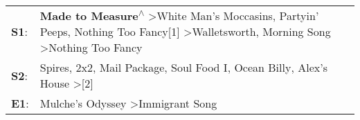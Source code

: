 \begin{supertabular}{p{0.03\textwidth}p{0.92\textwidth}}
 \textbf{S1}:  &  \textbf{Made to Measure\textsuperscript{$\wedge$}} \textgreater \enspace White Man's Moccasins\textsuperscript{}, \enspace Partyin' Peeps\textsuperscript{}, \enspace Nothing Too Fancy[1]\textsuperscript{} \textgreater \enspace Walletsworth\textsuperscript{}, \enspace Morning Song\textsuperscript{} \textgreater \enspace Nothing Too Fancy\textsuperscript{}  \enspace  \\
 \textbf{S2}:  &                                                                                            Spires\textsuperscript{}, \enspace 2x2\textsuperscript{}, \enspace Mail Package\textsuperscript{}, \enspace Soul Food I\textsuperscript{}, \enspace Ocean Billy\textsuperscript{}, \enspace Alex's House\textsuperscript{} \textgreater {}[2]\textsuperscript{}  \enspace  \\
 \textbf{E1}:  &                                                                                                                                                                                                                                                                             Mulche's Odyssey\textsuperscript{} \textgreater \enspace Immigrant Song\textsuperscript{}  \enspace  \\
\end{supertabular}
